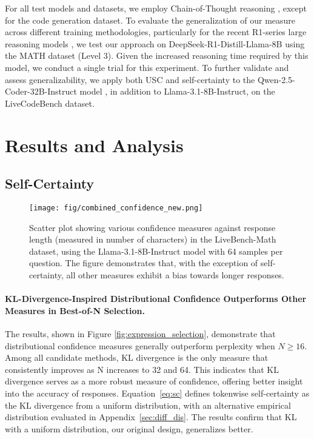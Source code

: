 For all test models and datasets, we employ Chain-of-Thought reasoning \cite{wei2022chain}, except for the code generation dataset. To evaluate the generalization of our measure across different training methodologies, particularly for the recent R1-series large reasoning models \cite{guo2025deepseek}, we test our approach on DeepSeek-R1-Distill-Llama-8B using the MATH dataset (Level 3). Given the increased reasoning time required by this model, we conduct a single trial for this experiment. To further validate and assess generalizability, we apply both USC and self-certainty to the Qwen-2.5-Coder-32B-Instruct model \cite{hui2024qwen2}, in addition to Llama-3.1-8B-Instruct, on the LiveCodeBench dataset.


\section{Results and Analysis}\label{sec:result}

\subsection{Self-Certainty}



\begin{figure*}[t]
    \centering
    \texttt{[image: fig/combined\_confidence\_new.png]}
    \vspace{-1.em}
    \caption{Scatter plot showing various confidence measures against response length (measured in number of characters) in the LiveBench-Math dataset, using the Llama-3.1-8B-Instruct model with 64 samples per question. The figure demonstrates that, with the exception of self-certainty, all other measures exhibit a bias towards longer responses.} 
    \label{fig:scatter}
\end{figure*}

\paragraph{KL-Divergence-Inspired Distributional Confidence Outperforms Other Measures in Best-of-N Selection.}

The results, shown in Figure \ref{fig:expression_selection}, demonstrate that distributional confidence measures generally outperform perplexity when \(N \geq 16\). Among all candidate methods, KL divergence is the only measure that consistently improves as N increases to 32 and 64. This indicates that KL divergence serves as a more robust measure of confidence, offering better insight into the accuracy of responses. Equation~\ref{eq:sc} defines tokenwise self-certainty as the KL divergence from a uniform distribution, with an alternative empirical distribution evaluated in Appendix~\ref{sec:diff_dis}. The results confirm that KL with a uniform distribution, our original design, generalizes better.




